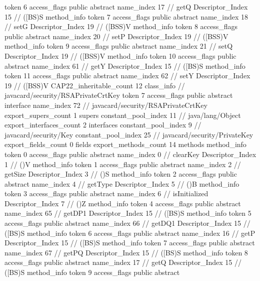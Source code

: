 {{{{{					token	6
					access_flags	public abstract
					name_index	17		// getQ
					Descriptor_Index	15		// ([BS)S
				}
				method_info {
					token	7
					access_flags	public abstract
					name_index	18		// setG
					Descriptor_Index	19		// ([BSS)V
				}
				method_info {
					token	8
					access_flags	public abstract
					name_index	20		// setP
					Descriptor_Index	19		// ([BSS)V
				}
				method_info {
					token	9
					access_flags	public abstract
					name_index	21		// setQ
					Descriptor_Index	19		// ([BSS)V
				}
				method_info {
					token	10
					access_flags	public abstract
					name_index	61		// getY
					Descriptor_Index	15		// ([BS)S
				}
				method_info {
					token	11
					access_flags	public abstract
					name_index	62		// setY
					Descriptor_Index	19		// ([BSS)V
				}
			}
			CAP22_inheritable_count	12
		}
		class_info {		// javacard/security/RSAPrivateCrtKey
			token	7
			access_flags	public abstract interface
			name_index	72		// javacard/security/RSAPrivateCrtKey
			export_supers_count	1
			supers {
				constant_pool_index	11		// java/lang/Object
			}
			export_interfaces_count	2
			interfaces {
				constant_pool_index	9		// javacard/security/Key
				constant_pool_index	25		// javacard/security/PrivateKey
			}
			export_fields_count	0
			fields {
			}
			export_methods_count	14
			methods {
				method_info {
					token	0
					access_flags	public abstract
					name_index	0		// clearKey
					Descriptor_Index	1		// ()V
				}
				method_info {
					token	1
					access_flags	public abstract
					name_index	2		// getSize
					Descriptor_Index	3		// ()S
				}
				method_info {
					token	2
					access_flags	public abstract
					name_index	4		// getType
					Descriptor_Index	5		// ()B
				}
				method_info {
					token	3
					access_flags	public abstract
					name_index	6		// isInitialized
					Descriptor_Index	7		// ()Z
				}
				method_info {
					token	4
					access_flags	public abstract
					name_index	65		// getDP1
					Descriptor_Index	15		// ([BS)S
				}
				method_info {
					token	5
					access_flags	public abstract
					name_index	66		// getDQ1
					Descriptor_Index	15		// ([BS)S
				}
				method_info {
					token	6
					access_flags	public abstract
					name_index	16		// getP
					Descriptor_Index	15		// ([BS)S
				}
				method_info {
					token	7
					access_flags	public abstract
					name_index	67		// getPQ
					Descriptor_Index	15		// ([BS)S
				}
				method_info {
					token	8
					access_flags	public abstract
					name_index	17		// getQ
					Descriptor_Index	15		// ([BS)S
				}
				method_info {
					token	9
					access_flags	public abstract
}}}}}
